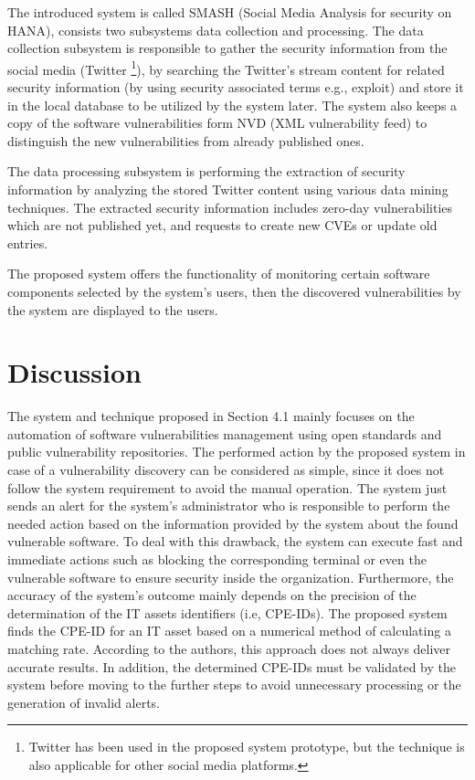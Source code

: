 \documentclass{llncs}
\begin{document}
\par The introduced system is called SMASH (Social Media Analysis for security on HANA), consists two subsystems data collection and processing. The data collection subsystem is responsible to gather the security information from the social media (Twitter \footnote{Twitter has been used in the proposed system prototype, but the technique is also applicable for other social media platforms.}), by searching the Twitter's stream content for related security information (by using security associated terms e.g., exploit) and store it in the local database to be utilized by the system later. The system also keeps a copy of the software vulnerabilities form NVD (XML vulnerability feed) to distinguish the new  vulnerabilities from already published ones.
\par
The data processing subsystem is performing the extraction of security information by analyzing the stored Twitter content using various data mining techniques. The extracted security information 
includes zero-day vulnerabilities which are not published yet, and requests to create new CVEs or update old entries.

The proposed system offers the functionality of monitoring certain software components selected by the system's users, then the discovered vulnerabilities by the system are displayed to the users.

\section{Discussion}

\par The system and technique proposed in Section 4.1 mainly focuses on the automation of software vulnerabilities management using open standards and public vulnerability repositories. The performed action by the proposed system in case of a vulnerability discovery can be considered as simple, since it does not follow the system requirement to avoid the manual operation. The system just sends an alert for the system's administrator who is responsible to perform the needed action based on the information provided by the system about the found vulnerable software. To deal with this drawback, the system can execute fast and immediate actions such as  blocking the corresponding terminal or even the vulnerable software  to ensure security inside the organization. Furthermore, the accuracy of the system's outcome mainly depends on the precision of the determination of the IT assets identifiers (i.e, CPE-IDs). The proposed system finds the CPE-ID for an IT asset based on a numerical method of calculating a matching rate. According to the authors, this approach does not always deliver accurate results. In addition, the determined CPE-IDs must be validated by the system before moving to the further steps to avoid unnecessary processing or the generation of invalid alerts.
\end{document}
